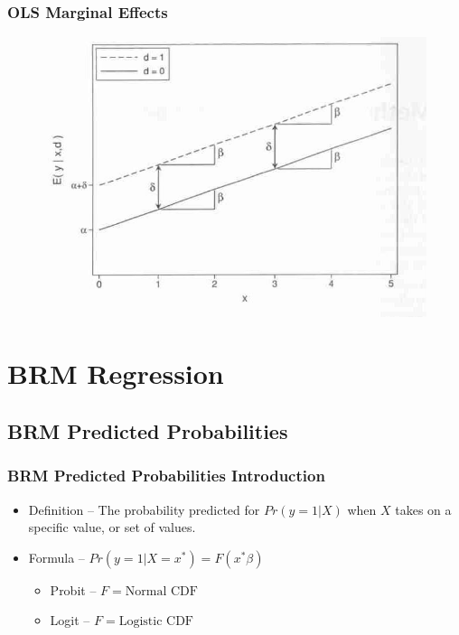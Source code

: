 \documentclass{beamer}
\begin{document}
\begin{frame}
	\frametitle{OLS Marginal Effects}
		\begin{figure}[p]
			\centering
			\includegraphics[scale=0.45]{images/ols_marginal_effects.png}
			\label{fig:fig1}
		\end{figure}
\end{frame}

\section{BRM Regression}

\subsection{BRM Predicted Probabilities}

\begin{frame}
\frametitle{BRM Predicted Probabilities Introduction}
	\begin{itemize}
		\item Definition -- The probability predicted for $Pr\left(y=1|X\right)$ when $X$ takes on a specific value, or set of values.
		\item Formula -- $Pr\left(y=1|X=x^{*}\right)=F\left(x^{*}\beta\right)$
			\begin{itemize}
				\item Probit -- $F=\mbox{Normal CDF}$
				\item Logit -- $F=\mbox{Logistic CDF}$
			\end{itemize}
	\end{itemize}
\end{frame}
\end{document}
